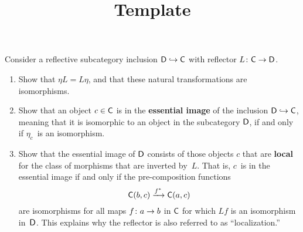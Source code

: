 \documentclass[../../solutions]{subfiles}
\title{Template}
\author{}
\begin{document}
\maketitle

%   

\begin{exercise}
  Consider a reflective subcategory inclusion ${\mathsf{D}}\hookrightarrow{\mathsf{C}}$
  with reflector ${L}\colon{{\mathsf{C}}}\to{{\mathsf{D}}}$.

  \begin{enumerate}[label=(\roman*)]
  \item Show that $\eta L = L\eta$, and that these natural
    transformations are isomorphisms.

  \item Show that an object $c\in{\mathsf{C}}$ is in the \textbf{essential
      image} of the inclusion ${\mathsf{D}}\hookrightarrow{\mathsf{C}}$, meaning that it
    is isomorphic to an object in the subcategory ${\mathsf{D}}$, if and only
    if $\eta_c$~is an isomorphism.

  \item Show that the essential image of ${\mathsf{D}}$ consists of those
    objects $c$ that are \textbf{local} for the class of morphisms
    that are inverted by~$L$.  That is, $c$~is in the essential image
    if and only if the pre-composition functions
    $${\mathsf{C}}(b,c) \xrightarrow{f^*} {\mathsf{C}}(a,c)$$
    are isomorphisms for all maps ${f}\colon{a}\to{b}$ in ${\mathsf{C}}$ for which
    $Lf$ is an isomorphism in~${\mathsf{D}}$.  This explains why the reflector
    is also referred to as ``localization.''
  \end{enumerate}
\end{exercise}
\end{document}
